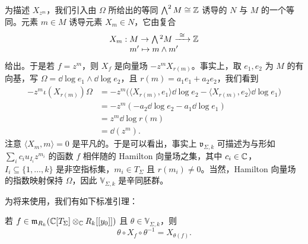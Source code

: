 为描述 $X_{z^m}$，我们引入由 $\Omega$ 所给出的等同 $\bigwedge^2M\cong\mathbb{Z}$ 诱导的 $N$ 与 $M$ 的一个等同。元素 $m\in M$ 诱导元素 $X_m\in N$，它由复合
\[
  \begin{array}{c}
    X_m:M\to\bigwedge{}^2M\xrightarrow{\ \cong\ }\mathbb{Z}\\
    m'\mapsto m\wedge m'
  \end{array}
\]
给出。于是若 $f=z^m$，则 $X_f$ 是向量场 $-z^mX_{r(m)}$。事实上，取 $e_1,e_2$ 为 $M$ 的有向基，写 $\Omega=\dd\log e_1\wedge\dd\log e_2$，且 $r(m)=a_1e_1+a_2e_2$，我们看到
\[
  \begin{aligned}
    -z^m\iota(X_{r(m)})\Omega
    &=-z^m\bigl(\langle X_{r(m)},e_1\rangle\dd\log e_2-\langle X_{r(m)},e_2\rangle\dd\log e_1\bigr)\\
    &=-z^m(-a_2\dd\log e_2-a_1\dd\log e_1)\\
    &=z^m\dd\log r(m)\\
    &=\dd(z^m).
  \end{aligned}
\]
注意 $\langle X_m,m\rangle=0$ 是平凡的。于是可以看出，事实上 $\mathfrak v_{\Sigma,k}$ 可描述为与形如 $\sum_ic_iu_{I_i}z^{m_i}$ 的函数 $f$ 相伴随的 Hamilton 向量场之集，其中 $c_i\in\mathbb{C}$，$I_i\subseteq\{1,\ldots,k\}$ 是非空指标集，$m_i\in T_\Sigma$ 且 $r(m_i)\ne0$。当然，Hamilton 向量场的指数映射保持 $\Omega$，因此 $\mathbb V_{\Sigma,k}$ 是辛同胚群。

为将来使用，我们有如下标准引理：

\begin{lemma}
若 $f\in\mathfrak m_{R_k}(\mathbb{C}[T_\Sigma]\otimes_{\mathbb{C}} R_k[[y_0]])$ 且 $\theta\in\mathbb V_{\Sigma,k}$，则
\[
  \theta\circ X_f\circ\theta^{-1}=X_{\theta(f)}.
\]
\end{lemma}

